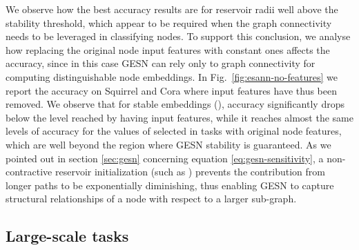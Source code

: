 \documentclass[final,5p,times,twocolumn]{elsarticle}
\begin{document}
We observe how the best accuracy results are for reservoir radii well above the stability threshold, which appear to be required when the graph connectivity needs to be leveraged in classifying nodes.
To support this conclusion, we analyse how replacing the original node input features with constant ones affects the accuracy, since in this case GESN can rely only to graph connectivity for computing distinguishable node embeddings.
In Fig.~\ref{fig:esann-no-features} we report the accuracy on Squirrel and Cora where input features have thus been removed.
We observe that for stable embeddings (), accuracy significantly drops below the level reached by having input features, while it reaches almost the same levels of accuracy for the values of  selected in tasks with original node features, which are well beyond the region where GESN stability is guaranteed.
As we pointed out in section \ref{sec:gesn} concerning equation \eqref{eq:gesn-sensitivity}, a non-contractive reservoir initialization (such as ) prevents the contribution from longer paths to be exponentially diminishing, thus enabling GESN to capture structural relationships of a node with respect to a larger sub-graph.

\subsection{Large-scale tasks}
\label{sec:experiments-large}
\end{document}
